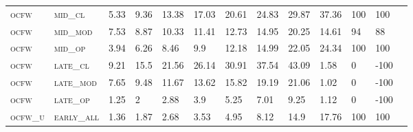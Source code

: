 \begin{sidewaystable}[!htbp]
\begin{tabular}{@{}lllllllllllll@{}}
\footnotesize \textsc{ocfw}        & \footnotesize \textsc{mid\_cl   }                & \footnotesize 5.33            & \footnotesize 9.36            & \footnotesize 13.38            & \footnotesize 17.03            & \footnotesize 20.61            & \footnotesize 24.83            & \footnotesize 29.87      & \footnotesize 37.36    & \footnotesize 100    & \footnotesize 100      \\
\footnotesize \textsc{ocfw}        & \footnotesize \textsc{mid\_mod  }                & \footnotesize 7.53            & \footnotesize 8.87            & \footnotesize 10.33            & \footnotesize 11.41            & \footnotesize 12.73            & \footnotesize 14.95            & \footnotesize 20.25      & \footnotesize 14.61    & \footnotesize 94     & \footnotesize 88       \\
\footnotesize \textsc{ocfw}        & \footnotesize \textsc{mid\_op   }                & \footnotesize 3.94            & \footnotesize 6.26            & \footnotesize 8.46             & \footnotesize 9.9              & \footnotesize 12.18            & \footnotesize 14.99            & \footnotesize 22.05      & \footnotesize 24.34    & \footnotesize 100    & \footnotesize 100      \\
\footnotesize \textsc{ocfw}        & \footnotesize \textsc{late\_cl  }                & \footnotesize 9.21            & \footnotesize 15.5            & \footnotesize 21.56            & \footnotesize 26.14            & \footnotesize 30.91            & \footnotesize 37.54            & \footnotesize 43.09      & \footnotesize 1.58     & \footnotesize 0      & \footnotesize -100     \\
\footnotesize \textsc{ocfw}        & \footnotesize \textsc{late\_mod }                & \footnotesize 7.65            & \footnotesize 9.48            & \footnotesize 11.67            & \footnotesize 13.62            & \footnotesize 15.82            & \footnotesize 19.19            & \footnotesize 21.06      & \footnotesize 1.02     & \footnotesize 0      & \footnotesize -100     \\
\footnotesize \textsc{ocfw}        & \footnotesize \textsc{late\_op  }                & \footnotesize 1.25            & \footnotesize 2               & \footnotesize 2.88             & \footnotesize 3.9              & \footnotesize 5.25             & \footnotesize 7.01             & \footnotesize 9.25       & \footnotesize 1.12     & \footnotesize 0      & \footnotesize -100     \\
\footnotesize \textsc{ocfw\_u}     & \footnotesize \textsc{early\_all}                & \footnotesize 1.36            & \footnotesize 1.87            & \footnotesize 2.68             & \footnotesize 3.53             & \footnotesize 4.95             & \footnotesize 8.12             & \footnotesize 14.9       & \footnotesize 17.76    & \footnotesize 100    & \footnotesize 100      \\

\end{tabular}
\end{sidewaystable}
